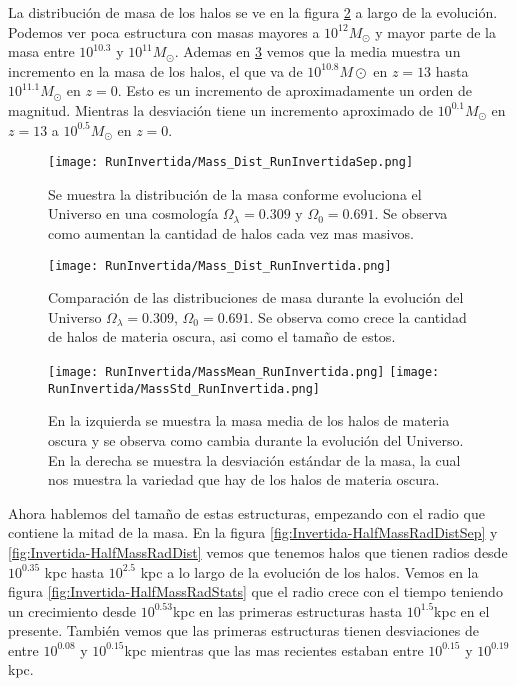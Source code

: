 La distribución de masa de los halos se ve en la figura \ref{fig:Invertida-MassDist} a largo de la evolución. Podemos ver poca estructura con masas mayores a $10^{12}M_\odot$ y mayor parte de la masa entre $10^{10.3}$ y $10^{11}M_\odot$. Ademas en  \ref{fig:Invertida-MassStats} vemos que la media muestra un incremento en la masa de los halos, el que va de $10^{10.8} M\odot$ en $z=13$ hasta $10^{11.1}M_\odot$ en $z=0$. Esto es un incremento de aproximadamente un orden de magnitud. Mientras la desviación tiene un incremento aproximado de $10^{0.1}M_\odot$ en $z=13$ a $10^{0.5}M_\odot$ en $z=0$. 

\begin{figure}[H]
    \centering
    \texttt{[image: RunInvertida/Mass\_Dist\_RunInvertidaSep.png]}
    \caption[Distribución de masa]{\footnotesize Se muestra la distribución de la masa conforme evoluciona el Universo en una cosmología $\Omega_\lambda = 0.309 $ y $\Omega_0 = 0.691$. Se observa como aumentan la cantidad de halos cada vez mas masivos.}
    \label{fig:Invertida-MassDistSep}
\end{figure}

\begin{figure}[H]
    \centering
    \texttt{[image: RunInvertida/Mass\_Dist\_RunInvertida.png]}
    \caption[Comparación de distribución de masa]{\footnotesize Comparación de las distribuciones de masa durante la evolución del Universo $\Omega_\lambda = 0.309 $, $\Omega_0 = 0.691$. Se observa como crece la cantidad de halos de materia oscura, asi como el tamaño de estos.}
    \label{fig:Invertida-MassDist}
\end{figure}

\begin{figure}[H]
    \centering
    \texttt{[image: RunInvertida/MassMean\_RunInvertida.png]}
    \texttt{[image: RunInvertida/MassStd\_RunInvertida.png]}
    \caption[Media y desviación estándar de la distribución de masa]{\footnotesize En la izquierda se muestra la masa media de los halos de materia oscura y se observa como cambia durante la evolución del Universo. En la derecha se muestra la desviación estándar de la masa, la cual nos muestra la variedad que hay de los halos de materia oscura.}
    \label{fig:Invertida-MassStats}
\end{figure}

Ahora hablemos del tamaño de estas estructuras, empezando con el radio que contiene la mitad de la masa. En la figura \ref{fig:Invertida-HalfMassRadDistSep} y \ref{fig:Invertida-HalfMassRadDist} vemos que tenemos halos que tienen radios desde $10^{0.35}$ kpc hasta $10^{2.5}$ kpc a lo largo de la evolución de los halos. Vemos en la figura \ref{fig:Invertida-HalfMassRadStats} que el radio crece con el tiempo teniendo un crecimiento desde $10^{0.53}$kpc en las primeras estructuras hasta $10^{1.5}$kpc en el presente. También vemos que las primeras estructuras tienen desviaciones de entre $10^{0.08}$ y $10^{0.15}$kpc mientras que las mas recientes estaban entre $10^{0.15}$ y $10^{0.19}$ kpc.

